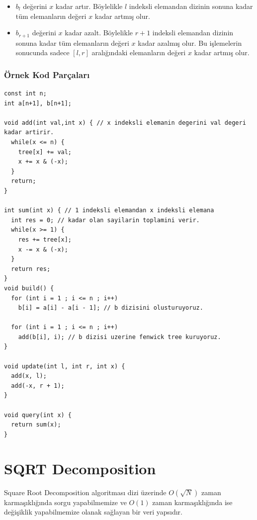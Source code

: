 \documentclass[12pt]{article}
\begin{document}
    \begin{itemize}
        \item $b_l$ de\u{g}erini $x$ kadar art{\i}r. B\"{o}ylelikle $l$ indeksli elemandan dizinin sonuna kadar t\"{u}m elemanlar{\i}n de\u{g}eri $x$ kadar artm{\i}\c{s} olur.
        \item $b_{r + 1}$ de\u{g}erini $x$ kadar azalt. B\"{o}ylelikle $r + 1$ indeksli elemandan dizinin sonuna kadar t\"{u}m elemanlar{\i}n de\u{g}eri $x$ kadar azalm{\i}\c{s} olur. Bu i\c{s}lemelerin sonucunda sadece $[l,r]$ aral{\i}\u{g}{\i}ndaki elemanlar{\i}n de\u{g}eri $x$ kadar artm{\i}\c{s} olur.
    \end{itemize}
    
    \subsubsection{\"{O}rnek Kod Par\c{c}alar{\i}}
    
    \begin{verbatim}
const int n;
int a[n+1], b[n+1];

void add(int val,int x) { // x indeksli elemanin degerini val degeri kadar artirir.
  while(x <= n) {
    tree[x] += val;
    x += x & (-x);
  }
  return;
}

int sum(int x) { // 1 indeksli elemandan x indeksli elemana
  int res = 0; // kadar olan sayilarin toplamini verir.
  while(x >= 1) {
    res += tree[x];
    x -= x & (-x);
  }
  return res;
}
void build() {
  for (int i = 1 ; i <= n ; i++)
    b[i] = a[i] - a[i - 1]; // b dizisini olusturuyoruz.

  for (int i = 1 ; i <= n ; i++)
    add(b[i], i); // b dizisi uzerine fenwick tree kuruyoruz.
}

void update(int l, int r, int x) {
  add(x, l);
  add(-x, r + 1);
}

void query(int x) {
  return sum(x);
}

    \end{verbatim}
    
    \cleardoublepage

	\section{SQRT Decomposition}
	
	Square Root Decomposition algoritmas{\i} dizi \"{u}zerinde $O(\sqrt{N})$ zaman karma\c{s}{\i}kl{\i}\u{g}{\i}nda sorgu yapabilmemize ve $O(1)$ zaman karma\c{s}{\i}kl{\i}\u{g}{\i}nda ise de\u{g}i\c{s}iklik yapabilmemize olanak sa\u{g}layan bir veri yaps{\i}d{\i}r.
	
\end{document}
